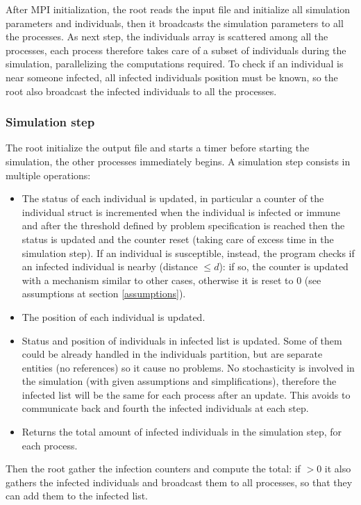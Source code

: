\documentclass[10pt]{article}
\begin{document}
	After MPI initialization, the root reads the input file and initialize all simulation parameters and individuals, then it broadcasts the simulation parameters to all the processes. As next step, the individuals array is scattered among all the processes, each process therefore takes care of a subset of individuals during the simulation, parallelizing the computations required. To check if an individual is near someone infected, all infected individuals position must be known, so the root also broadcast the infected individuals to all the processes.
	
	\subsubsection{Simulation step}
	The root initialize the output file and starts a timer before starting the simulation, the other processes immediately begins. A simulation step consists in multiple operations:
	\begin{itemize}
		\item The status of each individual is updated, in particular a counter of the individual struct is incremented when the individual is infected or immune and after the threshold defined by problem specification is reached then the status is updated and the counter reset (taking care of excess time in the simulation step). If an individual is susceptible, instead, the program checks if an infected individual is nearby (distance $ \le d $): if so, the counter is updated with a mechanism similar to other cases, otherwise it is reset to 0 (see assumptions at section \ref{assumptions}).
		\item The position of each individual is updated.
		\item Status and position of individuals in infected list is updated. Some of them could be already handled in the individuals partition, but are separate entities (no references) so it cause no problems. No stochasticity is involved in the simulation (with given assumptions and simplifications), therefore the infected list will be the same for each process after an update. This avoids to communicate back and fourth the infected individuals at each step.
		\item Returns the total amount of infected individuals in the simulation step, for each process. 
	\end{itemize}

	Then the root gather the infection counters and compute the total: if $ > 0 $ it also gathers the infected individuals and broadcast them to all processes, so that they can add them to the infected list.
	
\end{document}
